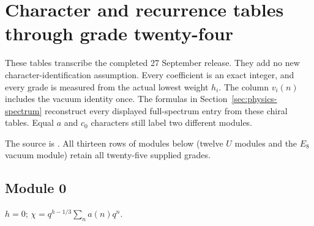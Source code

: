 \section{Character and recurrence tables through grade twenty-four}
\label{expdata:characters}
These tables transcribe the completed 27 September release. They add no
new character-identification assumption. Every coefficient is an exact
integer, and every grade is measured from the actual lowest weight $h_i$.
The column $v_i(n)$ includes the vacuum identity once. The formulas in
Section~\ref{sec:physics-spectrum} reconstruct every displayed full-spectrum
entry from these chiral tables. Equal $a$ and $c_0$ characters still label
two different modules.

The source is .
All thirteen rows of modules below (twelve $U$ modules and the $E_8$
vacuum module) retain all twenty-five supplied grades.

\subsection{Module 0}
$h=0$; $\chi=q^{h-1/3}\sum_n a(n)q^n$.

